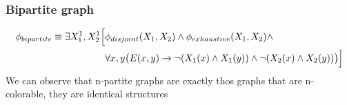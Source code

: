 \documentclass{article}
\begin{document}
\subsubsection{Bipartite graph}
$$\begin{aligned}
\phi_{bipartite} \equiv \exists X_1^1, X_2^1 \Bigl[ & \phi_{disjoint}(X_1, X_2) \land \phi_{exhaustive}(X_1, X_2) \land \\
& \forall x, y \bigl( E(x, y) \rightarrow \neg(X_1(x) \land X_1(y)) \land \neg(X_2(x) \land X_2(y)) \bigr) \Bigr]
\end{aligned}$$
We can observe that n-partite graphs are exactly thos graphs that are n-colorable, they are identical structures
\end{document}

